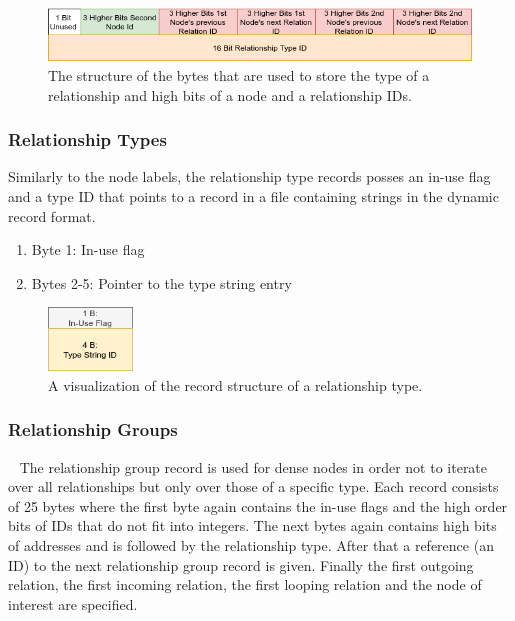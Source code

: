 \documentclass[a4paper,10pt]{article}
\begin{document}
            \begin{figure}[htp]\label{rel_type_bytes}
                \begin{center}
                    \includegraphics[keepaspectratio,width=\textwidth]{img/03_record/relationship/relationship_type_bytes.png}
                \end{center}
                \caption{The structure of the bytes that are used to store the type of a relationship and high bits of a node and a relationship IDs.} %
            \end{figure}
        

        \subsubsection{Relationship Types}
            Similarly to the node labels, the relationship type records posses an in-use flag and a type ID that points to a record in a file containing strings in the dynamic record format.
            \begin{enumerate}
                \item Byte 1: In-use flag
                \item Bytes 2-5: Pointer to the type string entry
            \end{enumerate}
        
            \begin{figure}[htp]\label{rel_type_record}
                \begin{center}
                    \includegraphics[keepaspectratio,height=0.2\textheight,width=0.2\textwidth]{img/03_record/relationship/rel_type_record.png}
                \end{center}
                \caption{A visualization of the record structure of a relationship type.} %
            \end{figure}
            
        \subsubsection{Relationship Groups}~\label{rel_group}
            The relationship group record is used for dense nodes in order not to iterate over all relationships but only over those of a specific type. Each record consists of 25 bytes where the first byte again contains the in-use flags and the high order bits of IDs that do not fit into integers. The next bytes again contains high bits of addresses and is followed by the relationship type. After that a reference (an ID) to the next relationship group record is given. Finally the first outgoing relation, the first incoming relation, the first looping relation and the node of interest are specified.
        
\end{document}
